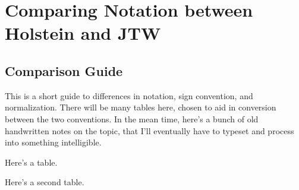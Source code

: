 


\chapter[Notation]{Comparing Notation between Holstein and JTW}
\label{appendix_notation}

\section{Comparison Guide}
	This is a short guide to differences in notation, sign convention, and normalization.  There will be many tables here, chosen to aid in conversion between the two conventions.  In the mean time, here's a bunch of old handwritten notes on the topic, that I'll eventually have to typeset and process into something intelligible.  
	
Here's a table.


Here's a second table.




